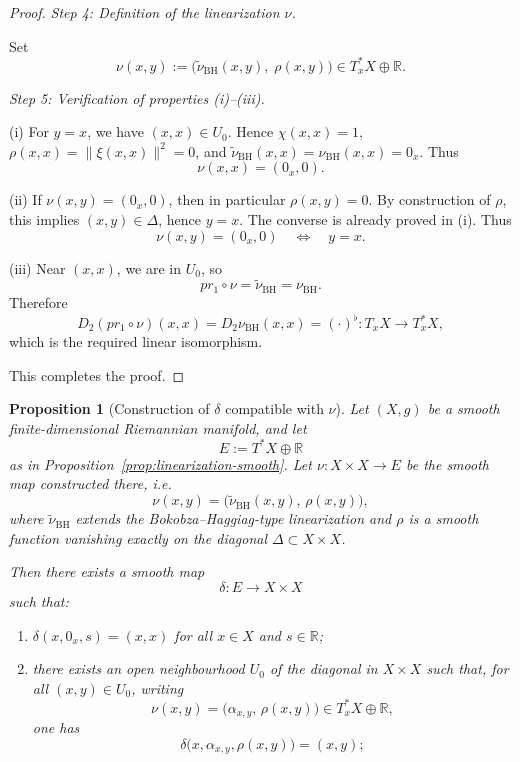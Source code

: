 \documentclass{amsart}
\newcounter{thm}
\newcounter{ex}
\newcounter{re}
\newtheorem{Proposition}[thm]{Proposition}
\begin{document}
{\begin{proof}
\medskip
\noindent
\emph{Step 4: Definition of the linearization $\nu$.}

Set
\[
\nu(x,y)
:= \bigl(\widetilde{\nu}_{\mathrm{BH}}(x,y),\;\rho(x,y)\bigr)
\in T_x^\ast X \oplus \mathbb{R}.
\]

\medskip
\noindent
\emph{Step 5: Verification of properties (i)--(iii).}

(i)  
For $y=x$, we have $(x,x)\in U_0$.
Hence $\chi(x,x)=1$, $\rho(x,x)=\|\xi(x,x)\|^2=0$, and
$\widetilde{\nu}_{\mathrm{BH}}(x,x)=\nu_{\mathrm{BH}}(x,x)=0_x$.
Thus
\[
\nu(x,x)=(0_x,0).
\]

(ii)  
If $\nu(x,y)=(0_x,0)$, then in particular $\rho(x,y)=0$.
By construction of $\rho$, this implies $(x,y)\in\Delta$, hence $y=x$.
The converse is already proved in (i).
Thus
\[
\nu(x,y)=(0_x,0)\quad\Longleftrightarrow\quad y=x.
\]

(iii)  
Near $(x,x)$, we are in $U_0$, so
\[
pr_1\circ \nu = \widetilde{\nu}_{\mathrm{BH}}
                = \nu_{\mathrm{BH}}.
\]
Therefore
\[
D_2(pr_1\circ \nu)(x,x)
= D_2\nu_{\mathrm{BH}}(x,x)
= (\cdot)^\flat : T_xX \to T_x^\ast X,
\]
which is the required linear isomorphism.

\medskip
This completes the proof.
\end{proof}
\begin{Proposition}[Construction of $\delta$ compatible with $\nu$]
\label{prop:delta-construction}
Let $(X,g)$ be a smooth finite-dimensional Riemannian manifold, and let
\[
E := T^\ast X \oplus \mathbb{R}
\]
as in Proposition~\ref{prop:linearization-smooth}.
Let $\nu : X\times X \to E$ be the smooth map constructed there, i.e.
\[
\nu(x,y) = \bigl(\widetilde{\nu}_{\mathrm{BH}}(x,y),\,\rho(x,y)\bigr),
\]
where $\widetilde{\nu}_{\mathrm{BH}}$ extends the Bokobza--Haggiag-type
linearization and $\rho$ is a smooth function vanishing exactly on the
diagonal $\Delta\subset X\times X$.

Then there exists a smooth map
\[
\delta : E \longrightarrow X\times X
\]
such that:
\begin{enumerate}
  \item[(i)] $\delta(x,0_x,s) = (x,x)$ for all $x\in X$ and $s\in\mathbb{R}$;

  \item[(ii)] there exists an open neighbourhood $U_0$ of the diagonal
  in $X\times X$ such that, for all $(x,y)\in U_0$, writing
  \[
    \nu(x,y) = \bigl(\alpha_{x,y},\, \rho(x,y)\bigr)
    \in T_x^\ast X\oplus\mathbb{R},
  \]
  one has
  \[
    \delta\bigl(x,\alpha_{x,y},\rho(x,y)\bigr) = (x,y);
  \]


\end{enumerate}
\end{Proposition}}
\end{document}

